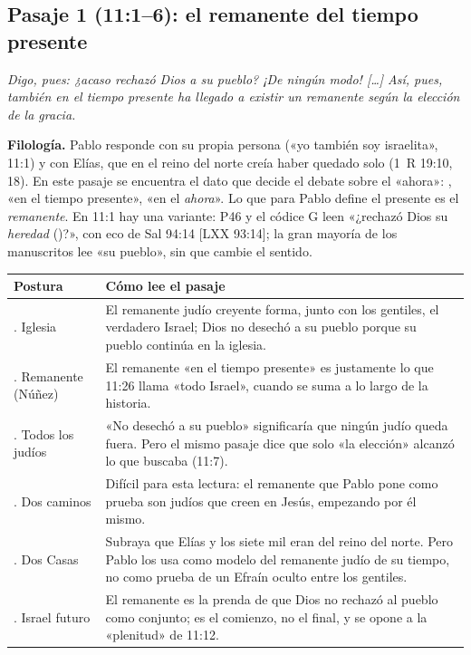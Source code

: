 \subsection{Pasaje 1 (11:1--6): el remanente del tiempo presente}

\begin{cita}[fontupper=\upshape]
\par\smallskip
\itshape Digo, pues: ¿acaso rechazó Dios a su pueblo? ¡De ningún modo! [\ldots] Así, pues, también en el tiempo presente ha llegado a existir un remanente según la elección de la gracia.
\end{cita}

\textbf{Filología.} Pablo responde con su propia persona («yo también soy israelita», 11:1) y con Elías, que en el reino del norte creía haber quedado solo (1~R 19:10, 18). En este pasaje se encuentra el dato que decide el debate sobre el «ahora»: , «en el tiempo presente», «en el \emph{ahora}». Lo que para Pablo define el presente es el \emph{remanente}. En 11:1 hay una variante: P46 y el códice G leen «¿rechazó Dios su \emph{heredad} ()?», con eco de Sal 94:14 [LXX 93:14]; la gran mayoría de los manuscritos lee «su pueblo», sin que cambie el sentido.

\begin{center}\footnotesize
\renewcommand{\arraystretch}{1.25}
\begin{tabular}{>{\RaggedRight\arraybackslash}p{2.9cm}>{\RaggedRight\arraybackslash}p{11.1cm}}
\toprule
\textbf{Postura} & \textbf{Cómo lee el pasaje}\\
\midrule
1. Iglesia & El remanente judío creyente forma, junto con los gentiles, el verdadero Israel; Dios no desechó a su pueblo porque su pueblo continúa en la iglesia.\\
2. Remanente (Núñez) & El remanente «en el tiempo presente» es justamente lo que 11:26 llama «todo Israel», cuando se suma a lo largo de la historia.\\
3. Todos los judíos & «No desechó a su pueblo» significaría que ningún judío queda fuera. Pero el mismo pasaje dice que solo «la elección» alcanzó lo que buscaba (11:7).\\
4. Dos caminos & Difícil para esta lectura: el remanente que Pablo pone como prueba son judíos que creen en Jesús, empezando por él mismo.\\
5. Dos Casas & Subraya que Elías y los siete mil eran del reino del norte. Pero Pablo los usa como modelo del remanente judío de su tiempo, no como prueba de un Efraín oculto entre los gentiles.\\
6. Israel futuro & El remanente es la prenda de que Dios no rechazó al pueblo como conjunto; es el comienzo, no el final, y se opone a la «plenitud» de 11:12.\\
\bottomrule
\end{tabular}\end{center}

